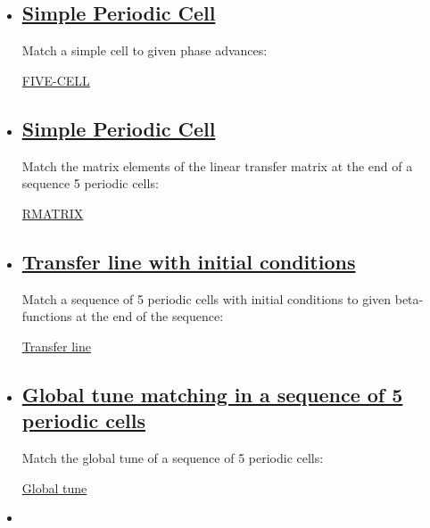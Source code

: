 \begin{itemize}
	\item 

\subsection{\href{cell}{Simple Periodic Cell}} Match a simple cell to given phase advances: 

\href{http://cern.ch/madx/madX/examples/match/5cell/job.5cell.madx}{FIVE-CELL}%
	\item 

\subsection{\href{cell}{Simple Periodic Cell}} Match the matrix elements of the linear transfer matrix at the end of a sequence 5 periodic cells: 

\href{http://cern.ch/madx/madX/examples/match/r-matrix/job.r-matrix.madx}{RMATRIX}%
	\item 

\subsection{\href{cell}{Transfer line with initial conditions}} Match a sequence of 5 periodic cells with initial conditions  to given beta-functions at the end of the sequence: 

\href{http://cern.ch/madx/madX/examples/match/line/job.line.madx}{Transfer line}%
	\item 

\subsection{\href{cell}{Global tune matching in a sequence of 5 periodic cells}} Match the global tune of a sequence of 5 periodic cells: 

\href{http://cern.ch/madx/madX/examples/match/global-tune/job.global-tune.madx}{Global tune}%
	\item 


\end{itemize}
